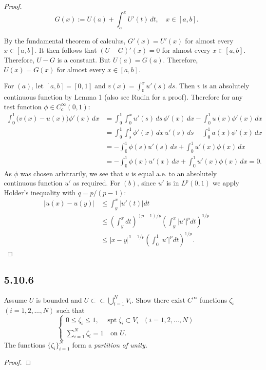 \documentclass{article}
\begin{document}
\begin{flushleft}
\begin{proof}
$$G(x):= U(a)+\int_a^x U'(t)\,dt, \quad x\in[a,b].$$

By the fundamental theorem of calculus, $G'(x)=U'(x)$ for almost every $x\in[a,b]$. It then follows that $(U-G)'(x)=0$ for almost every $x\in[a,b]$. Therefore, $U-G$ is a constant. But $U(a)=G(a)$. Therefore, $U(x)=G(x)$ for almost every $x\in[a,b].$


For $(a)$, let $[a,b]=[0,1]$ and $v(x)=\int_0^x u'(s)\,ds$. Then $v$ is an absolutely continuous function by Lemma 1 (also see Rudin \cite{10.5555/26851} for a proof). Therefore for any test function $\phi\in C_c^{\infty}(0,1):$
\begin{align*}
\int_0^1\big(v(x)-u(x)\big)\phi'(x)\,dx&=
\int_0^1\int_0^x u'(s)\,ds \,\phi'(x)\,dx- \int_0^1 u(x)\phi'(x)\,dx \\&=
\int_0^1\int_s^1 \phi'(x)\,dx \,u'(s)\,ds - \int_0^1 u(x)\phi'(x)\,dx \\&=
-\int_0^1 \phi(s)u'(s)\,ds + \int_0^1 u'(x)\phi(x)\,dx \\&=
-\int_0^1 \phi(x)u'(x)\,dx + \int_0^1 u'(x)\phi(x)\,dx =0.
\end{align*}
As $\phi$ was chosen arbitrarily, we see that $u$ is equal a.e. to an absolutely continuous function $u'$ as required.
For $(b)$, since $u'$ is in $L^p(0,1)$ we apply Holder's inequality with $q=p/(p-1)$:
\begin{align*}
|u(x)-u(y)| &\le \int_y^x |u'(t)|dt \\&\le \left( \int_y^x dt\right)^{(p-1)/p} \left( \int_y^x |u'|^p dt \right)^{1/p}
\\&\le|x-y|^{1-1/p} \left( \int_0^1 |u'|^p dt \right)^{1/p}.
\end{align*}

\end{proof}
\subsection{\textbf{5.10.6}}
Assume $U$ is bounded and $U \subset \subset \bigcup_{i=1}^{N} V_i$. Show there exist $C^{\infty}$ functions $\zeta_i$ $(i=1,2,\ldots,N)$ such that
\[
  \begin{cases}
  0 \le \zeta_i \le 1, \quad \operatorname{spt}\text{$\zeta_i \subset V_i$ $(i=1,2,\ldots,N)$} \\
  \sum_{i=1}^N \zeta_i=1 \quad \text{on $U$.}
  \end{cases}
\]
The functions $\{\zeta_i\}_{i=1}^N$ form a \textit{partition of unity}.
\begin{proof}


\end{proof}
\end{flushleft}
\end{document}
